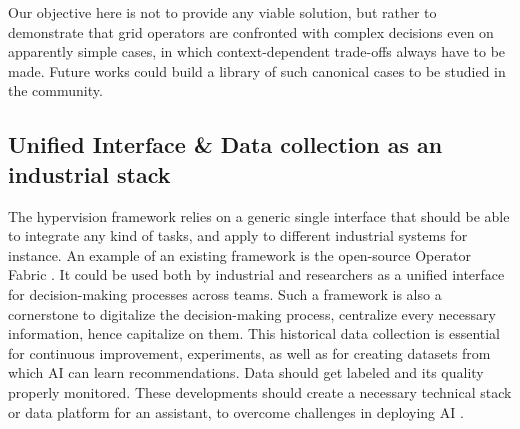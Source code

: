 \documentclass{IOS-Book-Article}
\begin{document}
\begin{itemize}
    
\end{itemize}

Our objective here is not to provide any viable solution, but rather to demonstrate that grid operators are confronted with complex decisions even on apparently simple cases, in which context-dependent trade-offs always have to be made. Future works could build a library of such canonical cases to be studied in the community.

\subsection{Unified Interface \& Data collection as an industrial stack}
The hypervision framework relies on a generic single interface that should be able to integrate any kind of tasks, and apply to different industrial systems for instance. 
An example of an existing framework is the open-source Operator Fabric \cite{op_fab}. It could be used both by industrial and researchers as a unified interface for decision-making processes across teams. 
Such a framework is also a cornerstone to digitalize the decision-making process, centralize every necessary information, hence capitalize on them. This historical data collection is essential for continuous improvement, experiments, as well as for creating datasets from which AI can learn recommendations. Data should get labeled and its quality properly monitored. These developments should create a necessary technical stack or data platform for an assistant, to overcome challenges in deploying AI \cite{paleyes2020challenges,baier2019challenges}.
\end{document}
